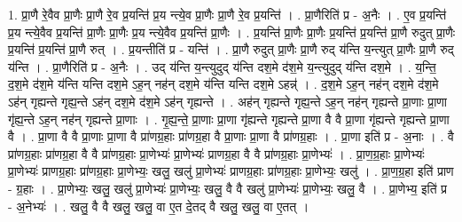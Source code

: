 \documentclass[17pt]{extarticle}
\begin{document}
1. प्रा॒णै रे॒वैव प्रा॒णैः प्रा॒णै रे॒व प्र॒यन्ति॑ प्र॒य न्त्ये॒व प्रा॒णैः प्रा॒णै रे॒व प्र॒यन्ति॑ । . प्रा॒णैरिति॑ प्र - अ॒नैः । . ए॒व प्र॒यन्ति॑ प्र॒य न्त्ये॒वैव प्र॒यन्ति॑ प्रा॒णैः प्रा॒णैः प्र॒य न्त्ये॒वैव प्र॒यन्ति॑ प्रा॒णैः । . प्र॒यन्ति॑ प्रा॒णैः प्रा॒णैः प्र॒यन्ति॑ प्र॒यन्ति॑ प्रा॒णै रुदुत् प्रा॒णैः प्र॒यन्ति॑ प्र॒यन्ति॑ प्रा॒णै रुत् । . प्र॒यन्तीति॑ प्र - यन्ति॑ । . प्रा॒णै रुदुत् प्रा॒णैः प्रा॒णै रुद् य॑न्ति य॒न्त्युत् प्रा॒णैः प्रा॒णै रुद् य॑न्ति । . प्रा॒णैरिति॑ प्र - अ॒नैः । . उद् य॑न्ति य॒न्त्युदुद् य॑न्ति दश॒मे द॑श॒मे य॒न्त्युदुद् य॑न्ति दश॒मे । . य॒न्ति॒ द॒श॒मे द॑श॒मे य॑न्ति यन्ति दश॒मे ऽह॒न् नह॑न् दश॒मे य॑न्ति यन्ति दश॒मे ऽहन्न्॑ । . द॒श॒मे ऽह॒न् नह॑न् दश॒मे द॑श॒मे ऽह॑न् गृह्यन्ते गृह्य॒न्ते ऽह॑न् दश॒मे द॑श॒मे ऽह॑न् गृह्यन्ते । . अह॑न् गृह्यन्ते गृह्य॒न्ते ऽह॒न् नह॑न् गृह्यन्ते प्रा॒णाः प्रा॒णा गृ॑ह्य॒न्ते ऽह॒न् नह॑न् गृह्यन्ते प्रा॒णाः । . गृ॒ह्य॒न्ते॒ प्रा॒णाः प्रा॒णा गृ॑ह्यन्ते गृह्यन्ते प्रा॒णा वै वै प्रा॒णा गृ॑ह्यन्ते गृह्यन्ते प्रा॒णा वै । . प्रा॒णा वै वै प्रा॒णाः प्रा॒णा वै प्रा॑णग्र॒हाः प्रा॑णग्र॒हा वै प्रा॒णाः प्रा॒णा वै प्रा॑णग्र॒हाः । . प्रा॒णा इति॑ प्र - अ॒नाः । . वै प्रा॑णग्र॒हाः प्रा॑णग्र॒हा वै वै प्रा॑णग्र॒हाः प्रा॒णेभ्यः॑ प्रा॒णेभ्यः॑ प्राणग्र॒हा वै वै प्रा॑णग्र॒हाः प्रा॒णेभ्यः॑ । . प्रा॒ण॒ग्र॒हाः प्रा॒णेभ्यः॑ प्रा॒णेभ्यः॑ प्राणग्र॒हाः प्रा॑णग्र॒हाः प्रा॒णेभ्यः॒ खलु॒ खलु॑ प्रा॒णेभ्यः॑ प्राणग्र॒हाः प्रा॑णग्र॒हाः प्रा॒णेभ्यः॒ खलु॑ । . प्रा॒ण॒ग्र॒हा इति॑ प्राण - ग्र॒हाः । . प्रा॒णेभ्यः॒ खलु॒ खलु॑ प्रा॒णेभ्यः॑ प्रा॒णेभ्यः॒ खलु॒ वै वै खलु॑ प्रा॒णेभ्यः॑ प्रा॒णेभ्यः॒ खलु॒ वै । . प्रा॒णेभ्य॒ इति॑ प्र - अ॒नेभ्यः॑ । . खलु॒ वै वै खलु॒ खलु॒ वा ए॒त दे॒तद् वै खलु॒ खलु॒ वा ए॒तत् । \newline
\end{document}
